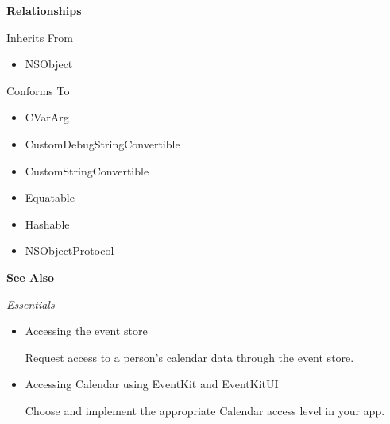 \documentclass{article}
\begin{document}
\textbf{Relationships}

Inherits From
\begin{itemize}
    \item NSObject
\end{itemize}

Conforms To
\begin{itemize}
    \item CVarArg
    \item CustomDebugStringConvertible
    \item CustomStringConvertible
    \item Equatable
    \item Hashable
    \item NSObjectProtocol
\end{itemize}

\textbf{See Also}

\textit{Essentials}
\begin{itemize}
    \item Accessing the event store

    Request access to a person's calendar data through the event store.
    \item Accessing Calendar using EventKit and EventKitUI

    Choose and implement the appropriate Calendar access level in your app.
\end{itemize}
\newpage
\end{document}
